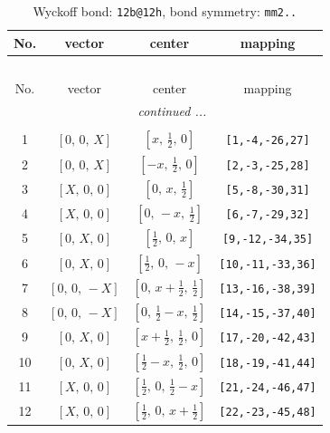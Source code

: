 \documentclass[fleqn,8pt]{jsarticle}
\begin{document}
\renewcommand{\arraystretch}{1.2}
\begin{longtable}{cccc}
\caption{Wyckoff bond: {\tt 12b@12h}, bond symmetry: {\tt mm2..}}
 \\
 \hline \hline
No. & vector & center & mapping \\ \hline \endfirsthead

\multicolumn{3}{l}{\tablename\ \thetable{}} \\
 \hline \hline
No. & vector & center & mapping \\ \hline \endhead

 \hline \hline
\multicolumn{3}{r}{\footnotesize\it continued ...} \\ \endfoot

 \hline \hline
\multicolumn{3}{r}{} \\ \endlastfoot

1 & $\left[ 0,\, 0,\, X \right]$ & $\left[ x,\, \frac{1}{2},\, 0 \right]$ & {\tt [1,-4,-26,27]} \\ \hline
2 & $\left[ 0,\, 0,\, X \right]$ & $\left[ - x,\, \frac{1}{2},\, 0 \right]$ & {\tt [2,-3,-25,28]} \\ \hline
3 & $\left[ X,\, 0,\, 0 \right]$ & $\left[ 0,\, x,\, \frac{1}{2} \right]$ & {\tt [5,-8,-30,31]} \\ \hline
4 & $\left[ X,\, 0,\, 0 \right]$ & $\left[ 0,\, - x,\, \frac{1}{2} \right]$ & {\tt [6,-7,-29,32]} \\ \hline
5 & $\left[ 0,\, X,\, 0 \right]$ & $\left[ \frac{1}{2},\, 0,\, x \right]$ & {\tt [9,-12,-34,35]} \\ \hline
6 & $\left[ 0,\, X,\, 0 \right]$ & $\left[ \frac{1}{2},\, 0,\, - x \right]$ & {\tt [10,-11,-33,36]} \\ \hline
7 & $\left[ 0,\, 0,\, - X \right]$ & $\left[ 0,\, x + \frac{1}{2},\, \frac{1}{2} \right]$ & {\tt [13,-16,-38,39]} \\ \hline
8 & $\left[ 0,\, 0,\, - X \right]$ & $\left[ 0,\, \frac{1}{2} - x,\, \frac{1}{2} \right]$ & {\tt [14,-15,-37,40]} \\ \hline
9 & $\left[ 0,\, X,\, 0 \right]$ & $\left[ x + \frac{1}{2},\, \frac{1}{2},\, 0 \right]$ & {\tt [17,-20,-42,43]} \\ \hline
10 & $\left[ 0,\, X,\, 0 \right]$ & $\left[ \frac{1}{2} - x,\, \frac{1}{2},\, 0 \right]$ & {\tt [18,-19,-41,44]} \\ \hline
11 & $\left[ X,\, 0,\, 0 \right]$ & $\left[ \frac{1}{2},\, 0,\, \frac{1}{2} - x \right]$ & {\tt [21,-24,-46,47]} \\ \hline
12 & $\left[ X,\, 0,\, 0 \right]$ & $\left[ \frac{1}{2},\, 0,\, x + \frac{1}{2} \right]$ & {\tt [22,-23,-45,48]} \\
\end{longtable}
\end{document}
